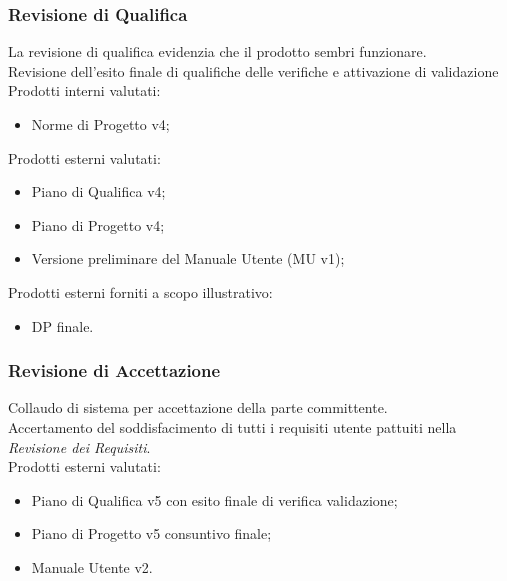 \documentclass[12pt,a4paper,titlepage]{article}
\begin{document}
\subsubsection{Revisione di Qualifica}
La revisione di qualifica evidenzia che il prodotto sembri funzionare. \\
Revisione dell'esito finale di qualifiche delle verifiche e attivazione di validazione \\
Prodotti interni valutati:
\begin{itemize}
	\item Norme di Progetto v4;
\end{itemize}
Prodotti esterni valutati:
\begin{itemize}
	\item Piano di Qualifica v4;
	\item Piano di Progetto v4;
	\item Versione preliminare del Manuale Utente (MU v1);
\end{itemize}
Prodotti esterni forniti a scopo illustrativo:
\begin{itemize}
	\item DP finale.
\end{itemize}

\subsubsection{Revisione di Accettazione}
Collaudo di sistema per accettazione della parte committente.\\
Accertamento del soddisfacimento di tutti i requisiti utente pattuiti nella \textit{Revisione dei Requisiti}.\\
Prodotti esterni valutati:
\begin{itemize}
	\item Piano di Qualifica v5 con esito finale di verifica validazione;
	\item Piano di Progetto v5 consuntivo finale;
	\item Manuale Utente v2.
\end{itemize}

\newpage

\end{document}
